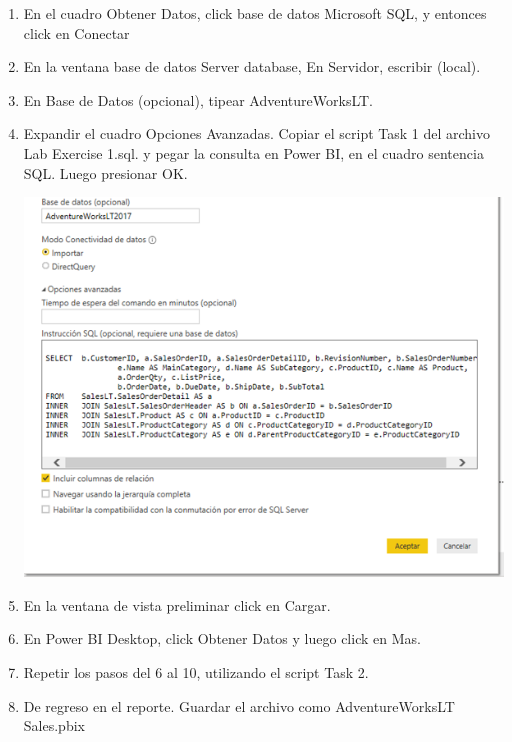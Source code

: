 \begin{itemize}
\begin{enumerate}
	
    \item En el cuadro Obtener Datos, click base de datos Microsoft SQL, y entonces click en Conectar
    
    \item En la ventana base de datos Server database, En Servidor, escribir (local).
    
    \item En Base de Datos (opcional), tipear AdventureWorksLT.
    
    
    \item Expandir el cuadro Opciones Avanzadas. Copiar el script Task 1 del archivo Lab Exercise 1.sql. y pegar la consulta en Power BI, en el cuadro sentencia SQL. Luego presionar OK.
    
        \begin{center}
	\includegraphics[width=13cm]{./Imagenes/2}
	\end{center}
    
    \item  En la ventana de vista preliminar click en Cargar.
    
    \item En Power BI Desktop, click Obtener Datos y luego click en Mas.

    \item Repetir los pasos del 6 al 10, utilizando el script Task 2.

   \item De regreso en el reporte. Guardar el archivo como AdventureWorksLT Sales.pbix
   
  
\end{enumerate}

\end{itemize}



